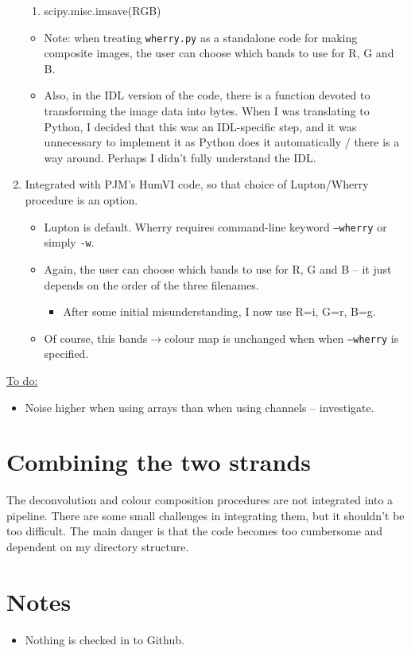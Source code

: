 \documentclass[letterpaper, 11pt]{article}
\begin{document}
\begin{enumerate}
{\begin{enumerate}
		\item scipy.misc.imsave(RGB)
	\end{enumerate}
	}
	\begin{itemize}
		\item Note: when treating \texttt{wherry.py} as a standalone code for making composite images, the user can choose which bands to use for R, G and B.
		\item Also, in the IDL version of the code, there is a function devoted to transforming the image data into bytes. When I was translating to Python, I decided that this was an IDL-specific step, and it was unnecessary to implement it as Python does it automatically / there is a way around. Perhaps I didn't fully understand the IDL.
	\end{itemize}
	\item Integrated with PJM's HumVI code, so that choice of Lupton/Wherry procedure is an option.
	\begin{itemize}
		\item Lupton is default. Wherry requires command-line keyword \texttt{--wherry} or simply \texttt{-w}.
		\item Again, the user can choose which bands to use for R, G and B -- it just depends on the order of the three filenames.
		\begin{itemize}
			\item After some initial misunderstanding, I now use R=i, G=r, B=g.
		\end{itemize}
		\item Of course, this bands$\rightarrow$colour map is unchanged when when \texttt{--wherry} is specified.
	\end{itemize}
\end{enumerate}

\underline{To do:}
\begin{itemize}
	\item Noise higher when using arrays than when using channels -- investigate.
\end{itemize}

\section{Combining the two strands}

The deconvolution and colour composition procedures are not integrated into a pipeline. There are some small challenges in integrating them, but it shouldn't be too difficult. The main danger is that the code becomes too cumbersome and dependent on my directory structure.

\section{Notes}

\begin{itemize}
	\item Nothing is checked in to Github.
\end{itemize}
\end{document}
